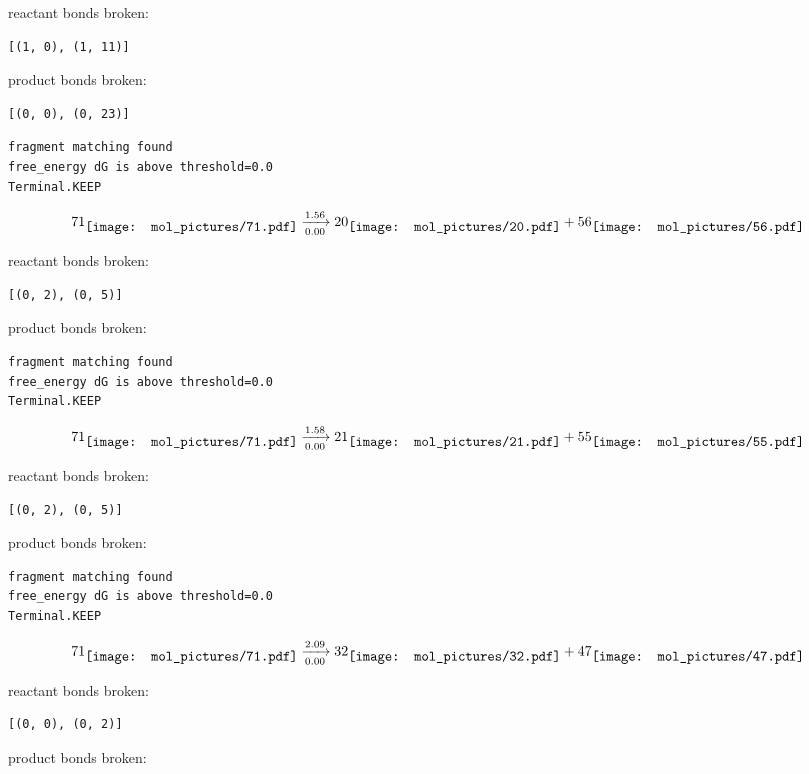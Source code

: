 \documentclass{article}
\begin{document}
reactant bonds broken:\begin{verbatim}
[(1, 0), (1, 11)]
\end{verbatim}
product bonds broken:\begin{verbatim}
[(0, 0), (0, 23)]
\end{verbatim}




\vspace{1cm}
\begin{verbatim}
fragment matching found
free_energy dG is above threshold=0.0
Terminal.KEEP
\end{verbatim}
$$
71
\raisebox{-.5\height}{\texttt{[image: mol\_pictures/71.pdf]}}
\xrightarrow[0.00]{1.56}
20
\raisebox{-.5\height}{\texttt{[image: mol\_pictures/20.pdf]}}
+
56
\raisebox{-.5\height}{\texttt{[image: mol\_pictures/56.pdf]}}
$$


reactant bonds broken:\begin{verbatim}
[(0, 2), (0, 5)]
\end{verbatim}
product bonds broken:



\vspace{1cm}
\begin{verbatim}
fragment matching found
free_energy dG is above threshold=0.0
Terminal.KEEP
\end{verbatim}
$$
71
\raisebox{-.5\height}{\texttt{[image: mol\_pictures/71.pdf]}}
\xrightarrow[0.00]{1.58}
21
\raisebox{-.5\height}{\texttt{[image: mol\_pictures/21.pdf]}}
+
55
\raisebox{-.5\height}{\texttt{[image: mol\_pictures/55.pdf]}}
$$


reactant bonds broken:\begin{verbatim}
[(0, 2), (0, 5)]
\end{verbatim}
product bonds broken:



\vspace{1cm}
\begin{verbatim}
fragment matching found
free_energy dG is above threshold=0.0
Terminal.KEEP
\end{verbatim}
$$
71
\raisebox{-.5\height}{\texttt{[image: mol\_pictures/71.pdf]}}
\xrightarrow[0.00]{2.09}
32
\raisebox{-.5\height}{\texttt{[image: mol\_pictures/32.pdf]}}
+
47
\raisebox{-.5\height}{\texttt{[image: mol\_pictures/47.pdf]}}
$$


reactant bonds broken:\begin{verbatim}
[(0, 0), (0, 2)]
\end{verbatim}
product bonds broken:
\end{document}
